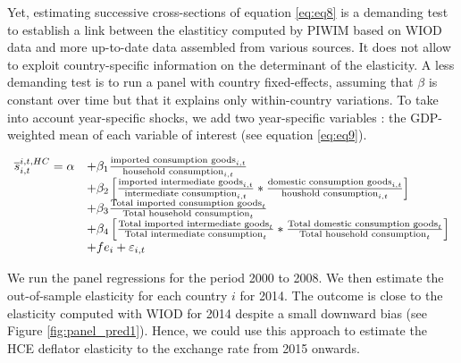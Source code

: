 \documentclass[12pt,a4paper]{paper}
\begin{document}
Yet, estimating successive cross-sections of equation \ref{eq:eq8} is a demanding test to establish a link between the elastiticy computed by PIWIM based on WIOD data and more up-to-date data assembled from various sources.
It does not allow to exploit country-specific information on the determinant of the elasticity.
A less demanding test is to run a panel with country fixed-effects, assuming that $\beta$ is constant over time but that it explains only within-country variations. To take into account year-specific shocks, we add two year-specific variables : the GDP-weighted mean of each variable of interest (see equation \ref{eq:eq9}). 


 \begin{equation}
\begin{array}{llll}
\overline{s}_{i,t}^{i,t,HC}= \alpha &+  \beta_1  \frac{\textnormal{imported consumption goods}_{i,t}}{\textnormal{household consumption}_{i,t}} \\
& + \beta_2 \left[ \frac{\textnormal{imported intermediate goods}_{i,t}}{\textnormal{intermediate consumption}_{i,t}}*\frac{\textnormal{domestic consumption goods}_{i,t}}{\textnormal{houshold consumption}_{i,t}}\right] \\ 
&+  \beta_3 \frac{\textnormal{Total imported consumption goods}_t}{\textnormal{Total household consumption}_t} \\
& + \beta_4  \left[ \frac{\textnormal{Total imported intermediate goods}_t}{\textnormal{Total intermediate consumption}_t}*\frac{\textnormal{Total domestic consumption goods}_t}{\textnormal{Total household consumption}_t} \right] \\ 
& +fe_{i}+\varepsilon_{i,t}
\end{array}
\label{eq:eq9}
\end{equation}

We run the panel regressions for the period 2000 to 2008.
We then estimate the out-of-sample elasticity for each country $i$ for 2014. 
The outcome is close to the elasticity computed with WIOD for 2014 despite a small downward bias (see Figure \ref{fig:panel_pred1}).
Hence, we could use this approach to estimate the HCE deflator elasticity to the exchange rate from 2015 onwards.
\end{document}
